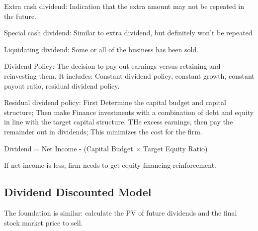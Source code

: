 \documentclass[10pt, a4paper]{article}
\begin{document}
        Extra cash dividend: Indication that the extra amount may not be repeated in the future. 

        Special cash dividend: Similar to extra dividend, but definitely won't be repeated

        Liquidating dividend: Some or all of the business has been sold. 

        Dividend Policy: The decision to pay out earnings versus retaining and reinvesting them. It includes: Constant dividend policy, constant growth, constant payout ratio, residual dividend policy.

        Residual dividend policy: First Determine the capital budget and capital structure; Then make Finance investments with a combination of debt and equity in line with the target capital structure. THe excess earnings, then pay the remainder out in dividends; This minimizes the cost for the firm.  

    \begin{center}
        Dividend = Net Income - (Capital Budget $\times$ Target Equity Ratio)
    \end{center}

        If net income is less, firm needs to get equity financing reinforcement. 
    \subsection{Dividend Discounted Model}
        The foundation is similar: calculate the PV of future dividends and the final stock market price to sell.   
    
\end{document}
